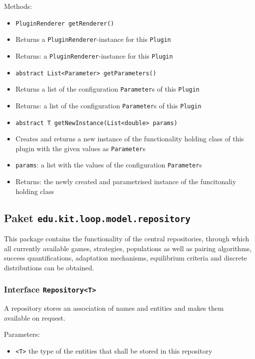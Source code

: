 \documentclass[parskip=full,11pt]{scrartcl}
\begin{document}
Methods:
\begin{itemize}\itemsep -10pt
	\item \texttt{PluginRenderer getRenderer()}
	\item[] Returns a \texttt{PluginRenderer}-instance for this \texttt{Plugin}
	\item[] Returns: a \texttt{PluginRenderer}-instance for this \texttt{Plugin}
	
	\item \texttt{abstract List<Parameter> getParameters()}
	\item[] Returns a list of the configuration \texttt{Parameter}s of this \texttt{Plugin}
	\item[] Returns: a list of the configuration \texttt{Parameter}s of this \texttt{Plugin}
	
	\item \texttt{abstract T getNewInstance(List<double> params)}
	\item[] Creates and returns a new instance of the functionality holding class of this plugin with the given values as \texttt{Parameter}s
	\item[] \texttt{params}: a list with the values of the configuration \texttt{Parameter}s
	\item[] Returns: the newly created and parametrised instance of the funcitonaliy holding class
\end{itemize}

\subsection{Paket \texttt{edu.kit.loop.model.repository}}

This package contains the functionality of the central repositories, through which all currently available games, strategies, populations as well as pairing algorithms, success quantifications, adaptation mechanisms, equilibrium criteria and discrete distributions can be obtained.


\subsubsection{Interface \texttt{Repository<T>}}

A repository stores an association of names and entities and makes them available on request.

Parameters:
\begin{itemize}\itemsep -10pt
	\item \texttt{<T>} the type of the entities that shall be stored in this repository
\end{itemize}
\end{document}
